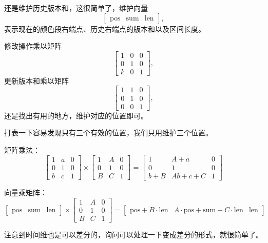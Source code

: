 \documentclass[a4paper, fontset=none]{ctexart}
\begin{document}
还是维护历史版本和，这很简单了，维护向量
\[
\begin{bmatrix} \text{pos} & \text{sum} & \text{len} \end{bmatrix},
\]
表示现在的颜色段右端点、历史右端点的版本和以及区间长度。

修改操作乘以矩阵
\[
\begin{bmatrix}
1 & 0 & 0 \\
0 & 1 & 0 \\
k & 0 & 1
\end{bmatrix},
\]
更新版本和乘以矩阵
\[
\begin{bmatrix}
1 & 1 & 0 \\
0 & 1 & 0 \\
0 & 0 & 1
\end{bmatrix},
\]
还是找出有用的地方，维护对应的位置即可。

打表一下容易发现只有三个有效的位置，我们只用维护三个位置。

矩阵乘法：
\[
\begin{bmatrix}
1 & a & 0 \\
0 & 1 & 0 \\
b & c & 1
\end{bmatrix}
\times
\begin{bmatrix}
1 & A & 0 \\
0 & 1 & 0 \\
B & C & 1
\end{bmatrix}
=
\begin{bmatrix}
1 & A + a & 0 \\
0 & 1 & 0 \\
b + B & Ab + c + C & 1
\end{bmatrix}
\]

向量乘矩阵：
\[
\begin{bmatrix} \text{pos} & \text{sum} & \text{len} \end{bmatrix}
\times
\begin{bmatrix}
1 & A & 0 \\
0 & 1 & 0 \\
B & C & 1
\end{bmatrix}
=
\begin{bmatrix}
\text{pos} + B \cdot \text{len} &
A \cdot \text{pos} + \text{sum} + C \cdot \text{len} &
\text{len}
\end{bmatrix}
\]


注意到时间维也是可以差分的，询问可以处理一下变成差分的形式，就很简单了。
\end{document}
